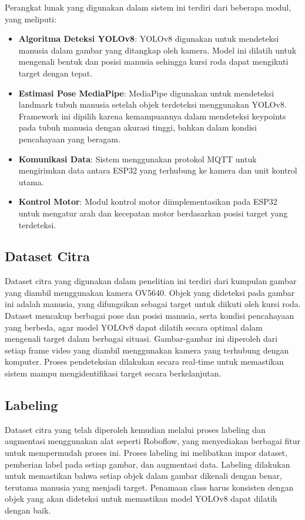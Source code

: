 Perangkat lunak yang digunakan dalam sistem ini terdiri dari beberapa modul, yang meliputi:

\begin{itemize}[nolistsep]
    \item \textbf{Algoritma Deteksi YOLOv8}: YOLOv8 digunakan untuk mendeteksi manusia dalam gambar yang ditangkap oleh kamera. Model ini dilatih untuk mengenali bentuk dan posisi manusia sehingga kursi roda dapat mengikuti target dengan tepat.
    \item \textbf{Estimasi Pose MediaPipe}: MediaPipe digunakan untuk mendeteksi landmark tubuh manusia setelah objek terdeteksi menggunakan YOLOv8. Framework ini dipilih karena kemampuannya dalam mendeteksi keypoints pada tubuh manusia dengan akurasi tinggi, bahkan dalam kondisi pencahayaan yang beragam.
    \item \textbf{Komunikasi Data}: Sistem menggunakan protokol MQTT untuk mengirimkan data antara ESP32 yang terhubung ke kamera dan unit kontrol utama.
    \item \textbf{Kontrol Motor}: Modul kontrol motor diimplementasikan pada ESP32 untuk mengatur arah dan kecepatan motor berdasarkan posisi target yang terdeteksi.
\end{itemize}

\subsection{Dataset Citra}
\label{subsec:datasetcitra}

Dataset citra yang digunakan dalam penelitian ini terdiri dari kumpulan gambar yang diambil menggunakan kamera OV5640. Objek yang dideteksi pada gambar ini adalah manusia, yang difungsikan sebagai target untuk diikuti oleh kursi roda. Dataset mencakup berbagai pose dan posisi manusia, serta kondisi pencahayaan yang berbeda, agar model YOLOv8 dapat dilatih secara optimal dalam mengenali target dalam berbagai situasi. Gambar-gambar ini diperoleh dari setiap frame video yang diambil menggunakan kamera yang terhubung dengan komputer. Proses pendeteksian dilakukan secara real-time untuk memastikan sistem mampu mengidentifikasi target secara berkelanjutan.

\subsection{Labeling}
\label{subsec:labeling}

Dataset citra yang telah diperoleh kemudian melalui proses labeling dan augmentasi menggunakan alat seperti Roboflow, yang menyediakan berbagai fitur untuk mempermudah proses ini. Proses labeling ini melibatkan impor dataset, pemberian label pada setiap gambar, dan augmentasi data. Labeling dilakukan untuk memastikan bahwa setiap objek dalam gambar dikenali dengan benar, terutama manusia yang menjadi target. Penamaan class harus konsisten dengan objek yang akan dideteksi untuk memastikan model YOLOv8 dapat dilatih dengan baik.

